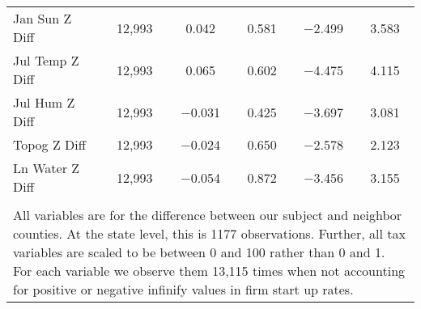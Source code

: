 \begin{table}[!htbp]
\begin{tabular}{@{\extracolsep{5pt}}lccccc}
Jan Sun Z Diff & 12,993 & 0.042 & 0.581 & $-$2.499 & 3.583 \\ 
Jul Temp Z Diff & 12,993 & 0.065 & 0.602 & $-$4.475 & 4.115 \\ 
Jul Hum Z Diff & 12,993 & $-$0.031 & 0.425 & $-$3.697 & 3.081 \\ 
Topog Z Diff & 12,993 & $-$0.024 & 0.650 & $-$2.578 & 2.123 \\ 
Ln Water Z Diff & 12,993 & $-$0.054 & 0.872 & $-$3.456 & 3.155 \\ 
\hline \\[-1.8ex] 
\multicolumn{6}{l}{All variables are for the difference between our subject and neighbor counties. At the state level, this is 1177 observations. Further, all tax variables are scaled to be between 0 and 100 rather than 0 and 1. For each variable we observe them 13,115 times when not accounting for positive or negative infinify values in firm start up rates.} \\ 
\end{tabular} 
\end{table} 
